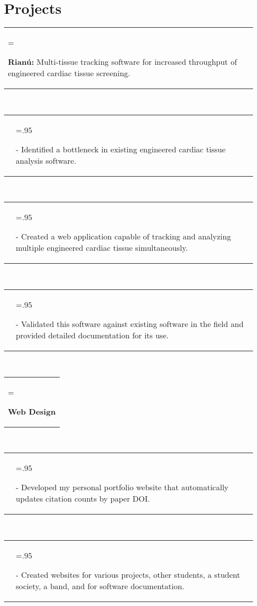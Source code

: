 \documentclass[letterpaper,11pt]{article}
\newcommand{\itemHeadings}[4]{
    \begin{tabularx}{\textwidth} {>{\hsize=.6\textwidth\raggedright\arraybackslash}X 
   >{\raggedleft\arraybackslash}X}
      #1 & \small#2 \\
      #3 & \small#4
    \end{tabularx}
    \\
}
\newcommand{\itemitems}[1]{
    \begin{tabularx}{\textwidth} {>{\raggedleft\arraybackslash}X >{\hsize=.95\textwidth\raggedright\arraybackslash}X}
      &- \small#1 \\
    \end{tabularx}
    \\
}
\newcommand{\projH}[1]{
    \begin{tabularx}{\textwidth} {>{\hsize=\textwidth\raggedright\arraybackslash}X}
      #1 \\
    \end{tabularx}
    \\
}
\newcommand{\sect}[1]{
    \section*{#1}
    \vspace{-3mm}
}
\begin{document}
\sect{Projects}
    \projH{\textbf{Rian\'u:} Multi-tissue tracking software for increased throughput of engineered cardiac tissue screening.}
        \itemitems
            {Identified a bottleneck in existing engineered cardiac tissue analysis software.}
        \itemitems
            {Created a web application capable of tracking and analyzing multiple engineered cardiac tissue simultaneously.}
        \itemitems
            {Validated this software against existing software in the field and provided detailed documentation for its use.}
    \projH{\textbf{Web Design}}
        \itemitems
            {Developed my personal portfolio website that automatically updates citation counts by paper DOI.}
        \itemitems
            {Created websites for various projects, other students, a student society, a band, and for software documentation.}

\end{document}
